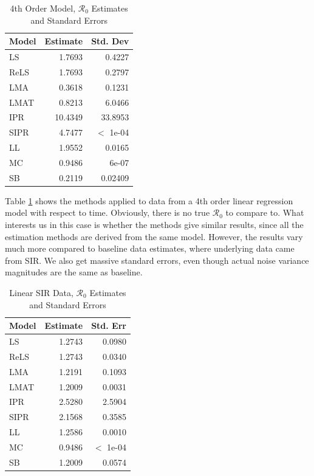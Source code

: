 \documentclass[12pt]{article}
\newcommand{\rr}{\ensuremath{\mathcal{R}_0}}
\begin{document}
\begin{table}[H]


\centering
\begin{tabular}[t]{l|r|r}
	\hline
	Model & Estimate & Std. Dev\\
	\hline
	LS & 1.7693 & 0.4227\\
	\hline
	ReLS & 1.7693 & 0.2797\\
	\hline
	LMA & 0.3618 & 0.1231\\
	\hline
	LMAT & 0.8213 & 6.0466\\
	\hline
	IPR & 10.4349 & 33.8953 \\
	\hline
	SIPR & 4.7477 &  $<$ 1e-04\\
	\hline
	LL & 1.9552 & 0.0165\\
	\hline
	MC & 0.9486 & 6e-07\\
	\hline
	SB & 0.2119 & 0.02409\\
	\hline
\end{tabular}
\caption{4th Order Model, $\rr$ Estimates and Standard Errors}\label{tab:other-res2} 
\end{table}

Table \ref{tab:other-res2} shows the methods applied to data from a 4th order linear regression model with respect to time. Obviously, there is no true $\rr$ to compare to. What interests us in this case is whether the methods give similar results, since all the estimation methods are derived from the same model. However, the results vary much more compared to baseline data estimates, where underlying data came from SIR. We also get massive standard errors, even though actual noise variance magnitudes are the same as baseline.

\begin{table}[H]
	
	\centering
	\begin{tabular}[t]{l|r|r}
		\hline
		Model & Estimate & Std. Err\\
		\hline
		LS & 1.2743 & 0.0980\\
		\hline
		ReLS & 1.2743 & 0.0340\\
		\hline
		LMA & 1.2191 & 0.1093\\
		\hline
		LMAT & 1.2009 & 0.0031\\
		\hline
		IPR & 2.5280 & 2.5904\\
		\hline
		SIPR & 2.1568 & 0.3585\\
		\hline
		LL & 1.2586 & 0.0010\\
		\hline
		MC & 0.9486 & $<$ 1e-04 \\
		\hline
		SB & 1.2009 & 0.0574\\
		\hline
	\end{tabular}
	\caption{Linear SIR Data, $\rr$ Estimates and Standard Errors}\label{tab:other-res3}
\end{table}
\end{document}

